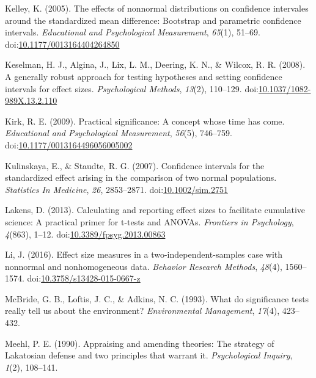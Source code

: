 \documentclass[
  man,floatsintext]{apa6}
\begin{document}
\leavevmode\hypertarget{ref-Kelley_2005}{}%
Kelley, K. (2005). The effects of nonnormal distributions on confidence intervales around the standardized mean difference: Bootstrap and parametric confidence intervals. \emph{Educational and Psychological Measurement}, \emph{65}(1), 51--69. doi:\href{https://doi.org/10.1177/0013164404264850}{10.1177/0013164404264850}

\leavevmode\hypertarget{ref-Keselman_et_al_2008}{}%
Keselman, H. J., Algina, J., Lix, L. M., Deering, K. N., \& Wilcox, R. R. (2008). A generally robust approach for testing hypotheses and setting confidence intervals for effect sizes. \emph{Psychological Methods}, \emph{13}(2), 110--129. doi:\href{https://doi.org/10.1037/1082-989X.13.2.110}{10.1037/1082-989X.13.2.110}

\leavevmode\hypertarget{ref-Kirk_2009}{}%
Kirk, R. E. (2009). Practical significance: A concept whose time has come. \emph{Educational and Psychological Measurement}, \emph{56}(5), 746--759. doi:\href{https://doi.org/10.1177/0013164496056005002\%20}{10.1177/0013164496056005002 }

\leavevmode\hypertarget{ref-Kulinskaya_Staudte_2007}{}%
Kulinskaya, E., \& Staudte, R. G. (2007). Confidence intervals for the standardized effect arising in the comparison of two normal populations. \emph{Statistics In Medicine}, \emph{26}, 2853--2871. doi:\href{https://doi.org/10.1002/sim.2751}{10.1002/sim.2751}

\leavevmode\hypertarget{ref-Lakens_2013}{}%
Lakens, D. (2013). Calculating and reporting effect sizes to facilitate cumulative science: A practical primer for t-tests and ANOVAs. \emph{Frontiers in Psychology}, \emph{4}(863), 1--12. doi:\href{https://doi.org/10.3389/fpsyg.2013.00863}{10.3389/fpsyg.2013.00863}

\leavevmode\hypertarget{ref-Li_2016}{}%
Li, J. (2016). Effect size measures in a two-independent-samples case with nonnormal and nonhomogeneous data. \emph{Behavior Research Methods}, \emph{48}(4), 1560--1574. doi:\href{https://doi.org/10.3758/s13428-015-0667-z}{10.3758/s13428-015-0667-z}

\leavevmode\hypertarget{ref-McBride_et_al_1993}{}%
McBride, G. B., Loftis, J. C., \& Adkins, N. C. (1993). What do significance tests really tell us about the environment? \emph{Environmental Management}, \emph{17}(4), 423--432.

\leavevmode\hypertarget{ref-Meehl_1990}{}%
Meehl, P. E. (1990). Appraising and amending theories: The strategy of Lakatosian defense and two principles that warrant it. \emph{Psychological Inquiry}, \emph{1}(2), 108--141.
\end{document}
